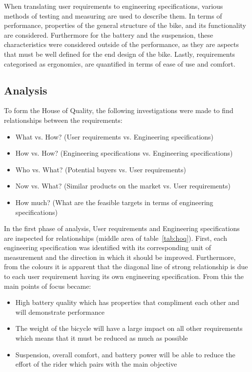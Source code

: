 \documentclass[a4paper,11pt]{article}
\begin{document}
When translating user requirements to engineering specifications, various methods of testing and measuring are used to describe them. In terms of performance, properties of the general structure of the bike, and its functionality are considered. Furthermore for the battery and the suspension, these characteristics were considered outside of the performance, as they are aspects that must be well defined for the end design of the bike. Lastly, requirements categorised as ergonomics, are quantified in terms of ease of use and comfort.

\subsection{Analysis}

To form the House of Quality, the following investigations were made to find relationships between the requirements:
\begin{itemize}
	\setlength{\itemsep}{0pt}
	\item What vs. How? (User requirements vs. Engineering specifications)
	\item How vs. How? (Engineering specifications vs. Engineering specifications)
	\item Who vs. What? (Potential buyers vs. User requirements)
	\item Now vs. What? (Similar products on the market vs. User requirements)
	\item How much? (What are the feasible targets in terms of engineering specifications)
\end{itemize}

In the first phase of analysis, User requirements and Engineering specifications are inspected for relationships (middle area of table~\ref{tab:hoq}). First, each engineering specification was identified with its corresponding unit of measurement and the direction in which it should be improved. Furthermore, from the colours it is apparent that the diagonal line of strong relationship is due to each user requirement having its own engineering specification. From this the main points of focus became:
\begin{itemize}
	\setlength{\itemsep}{0pt}
	\item High battery quality which has properties that compliment each other and will demonstrate performance
	\item The weight of the bicycle will have a large impact on all other requirements which means that it must be reduced as much as possible
	\item Suspension, overall comfort, and battery power will be able to reduce the effort of the rider which pairs with the main objective
\end{itemize}
\end{document}
